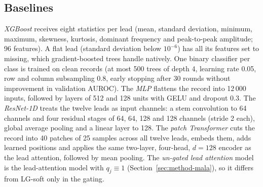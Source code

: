 \subsection{Baselines}
\label{sec:method-baselines}
\emph{XGBoost} receives eight statistics per lead (mean, standard deviation, minimum, maximum, skewness,
kurtosis, dominant frequency and peak-to-peak amplitude; 96 features). A flat lead (standard deviation below
$10^{-6}$) has all its features set to missing, which gradient-boosted trees handle natively. One binary
classifier per class is trained on clean records (at most 500 trees of depth 4, learning rate 0.05, row and column subsampling 0.8,
early stopping after 30 rounds without improvement in validation AUROC). The \emph{MLP} flattens the record into
12\,000 inputs, followed by layers of 512 and 128 units with GELU and dropout 0.3. The \emph{ResNet-1D} treats the
twelve leads as input channels: a stem convolution to 64 channels and four residual stages of 64, 64, 128 and 128
channels (stride 2 each), global average pooling and a linear layer to 128. The \emph{patch Transformer} cuts the
record into 40 patches of 25 samples across all twelve leads, embeds them, adds learned positions and applies the
same two-layer, four-head, $d=128$ encoder as the lead attention, followed by mean pooling. The \emph{un-gated
lead attention} model is the lead-attention model with $q_j\equiv1$ (Section~\ref{sec:method-mala}), so
it differs from LG-soft only in the gating.
